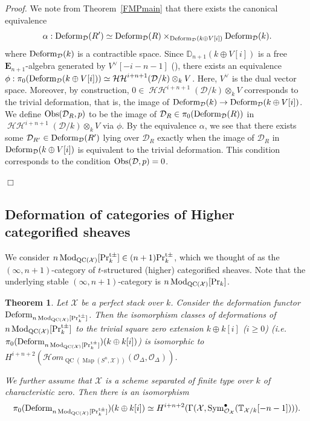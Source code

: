 \documentclass[leqno,12pt]{amsart}
\theoremstyle{plain}
\newtheorem{Theorem}{Theorem}[section]
\theoremstyle{definition}
\newcommand{\DD}{\mathbb{D}}
\newcommand{\HH}{\operatorname{\mathcal{HH}}}
\newcommand{\DDD}{\mathcal{D}}
\newcommand{\PR}{\textup{Pr}}
\newcommand{\PRTTT}{\textup{Pr}^{\textup{t}\pm}}
\newcommand{\OO}{{\mathcal{O}}}
\newcommand{\Mod}{\operatorname{Mod}}
\newcommand{\Map}{\operatorname{Map}}
\newcommand{\QC}{\operatorname{QC}}
\newcommand{\XX}{\mathcal{X}}
\newcommand{\Sym}{\operatorname{Sym}}
\newcommand{\Proof}{{\sl Proof.}\quad}
\newcommand{\QED}{{\unskip\nobreak\hfil\penalty50\quad\null\nobreak\hfil
{$\Box$}\parfillskip0pt\finalhyphendemerits0\par\medskip}}
\begin{document}
\Proof
We note from Theorem~\ref{FMPmain} that there exists the canonical equivalence 
\[
\alpha:\textup{Deform}_{\DDD}(R')\simeq \textup{Deform}_{\DDD}(R)\times_{\textup{Deform}_{\DDD}(k\oplus V[i])}\textup{Deform}_{\DDD}(k).
\]
where $\textup{Deform}_{\DDD}(k)$ is a contractible space.
Since $\DD_{n+1}(k\oplus V[i])$ is a free $\mathbf{E}_{n+1}$-algebra generated by $V^{\vee}[-i-n-1]$ (\cite[X, Proposition 4.5.6]{DAG}),
there exists an equivalence $\phi:\pi_0(\textup{Deform}_{\DDD}(k\oplus V[i])) \simeq \HH^{i+n+1}(\DDD/k)\otimes_kV$.
Here, $V^\vee$ is the dual vector space.
Moreover, by construction,
$0\in \HH^{i+n+1}(\DDD/k)\otimes_kV$ corresponds to the trivial deformation, that is, the image of $\textup{Deform}_{\DDD}(k)\to \textup{Deform}_{\DDD}(k\oplus V[i])$.
We define $\textup{Obs}(\DDD_R,p)$ to be the image of $\DDD_R\in \pi_0(\textup{Deform}_{\DDD}(R))$
in $\HH^{i+n+1}(\DDD/k)\otimes_kV$ via $\phi$.
By the equivalence $\alpha$, we see that 
there exists some $\DDD_{R'}\in \textup{Deform}_{\DDD}(R')$ lying over $\DDD_R$ exactly when
the image of $\DDD_{R}$ in $\textup{Deform}_{\DDD}(k\oplus V[i])$ is equivalent to the trivial deformation.
This condition corresponds to the condition $\textup{Obs}(\DDD,p)=0$.
\QED


\subsection{Deformation of categories of Higher categorified sheaves}


We consider
$n\Mod_{\QC(\mathcal{X})}[\PRTTT_k]\in (n+1)\PRTTT_k$, which we thought of as the $(\infty,n+1)$-category of $t$-structured (higher) categorified sheaves.
Note that the underlying stable $(\infty,n+1)$-category is $n\Mod_{\QC(\mathcal{X})}[\PR_k]$.




\begin{Theorem}
\label{higherfinal}
Let $\XX$ be a perfect stack over $k$. 
Consider the deformation functor $\textup{Deform}_{n\Mod_{\QC(\mathcal{X})}[\PRTTT_k]}$.
Then the isomorphism classes of deformations of $n\Mod_{\QC(\mathcal{X})}[\PRTTT_k]$ to the trivial square zero extension $k\oplus k[i]$ ($i\ge0$) (i.e. $\pi_0(\textup{Deform}_{n\Mod_{\QC(\mathcal{X})}[\PRTTT_k]})(k\oplus k[i])$)
is isomorphic to
$H^{i+n+2}(\mathcal{H}om_{\QC(\Map(S^n,\mathcal{X}))}(\OO_{\Delta}, \OO_{\Delta}))$.


We further assume that $\XX$ is a scheme separated of finite type over $k$ of characteristic zero. 
Then there is an isomorphism
\[
\pi_0(\textup{Deform}_{n\Mod_{\QC(\mathcal{X})}[\PRTTT_k]})(k\oplus k[i])\simeq 
H^{i+n+2}(\Gamma(\XX,\Sym_{\OO_{\XX}}^{\bullet}(\mathbb{T}_{\XX/k}[-n-1]))).
\]
\end{Theorem}
\end{document}
